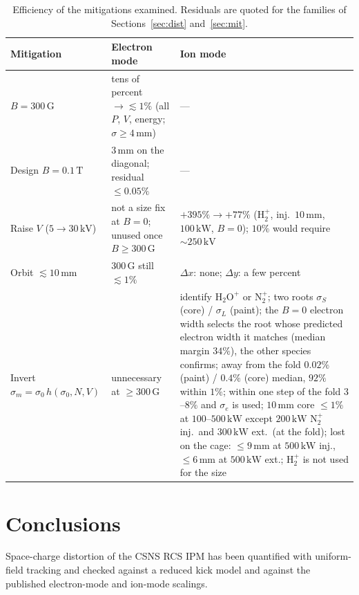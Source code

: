 \documentclass[hyperref]{cernrep}
\begin{document}
\begin{table}[htbp]
\centering
\caption{Efficiency of the mitigations examined. Residuals are quoted
for the families of Sections~\ref{sec:dist} and~\ref{sec:mit}.}
\label{tab:eff}
\begin{tabular}{p{3.4cm}p{5.4cm}p{5.4cm}}
\hline\hline
Mitigation & Electron mode & Ion mode \\
\hline
$B=300\,\mathrm{G}$
  & tens of percent $\to\lesssim 1\%$
    (all $P$, $V$, energy; $\sigma\ge 4\,\mathrm{mm}$)
  & --- \\
Design $B=0.1\,\mathrm{T}$
  & $3\,\mathrm{mm}$ on the diagonal; residual $\le 0.05\%$
  & --- \\
Raise $V$ ($5\to 30\,\mathrm{kV}$)
  & not a size fix at $B=0$; unused once $B\ge 300\,\mathrm{G}$
  & $+395\%\to +77\%$ ($\mathrm{H}_2^+$, inj.\ $10\,\mathrm{mm}$,
    $100\,\mathrm{kW}$, $B=0$); $10\%$ would require
    $\sim 250\,\mathrm{kV}$ \\
Orbit $\lesssim 10\,\mathrm{mm}$
  & $300\,\mathrm{G}$ still $\lesssim 1\%$
  & $\Delta x$: none; $\Delta y$: a few percent \\
Invert $\sigma_m=\sigma_0\,h(\sigma_0,N,V)$
  & unnecessary at $\ge 300\,\mathrm{G}$
  & identify $\mathrm{H}_2\mathrm{O}^+$ or $\mathrm{N}_2^+$; two
    roots $\sigma_S$ (core) / $\sigma_L$ (paint); the $B=0$ electron
    width selects the root whose predicted electron width it matches
    (median margin $34\%$), the other species confirms; away from the fold $0.02\%$ (paint) / $0.4\%$ (core)
    median, $92\%$ within $1\%$; within one step of the fold
    $3$--$8\%$ and $\sigma_e$ is used; $10\,\mathrm{mm}$ core
    $\le 1\%$ at $100$--$500\,\mathrm{kW}$ except $200\,\mathrm{kW}$
    $\mathrm{N}_2^+$ inj.\ and $300\,\mathrm{kW}$ ext.\ (at the fold);
    lost on the cage: $\le 9\,\mathrm{mm}$ at $500\,\mathrm{kW}$ inj.,
    $\le 6\,\mathrm{mm}$ at $500\,\mathrm{kW}$ ext.;
    $\mathrm{H}_2^+$ is not used for the size \\
\hline\hline
\end{tabular}
\end{table}

\section{Conclusions}
\label{sec:conc}

Space-charge distortion of the CSNS RCS IPM has been quantified with
uniform-field tracking and checked against a reduced kick model and
against the published electron-mode and ion-mode scalings.
\end{document}
